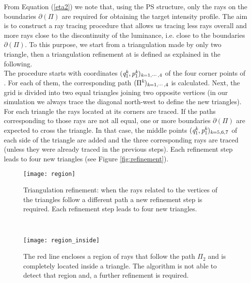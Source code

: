 From Equation (\ref{eta2}) we note that, using the PS structure, only the rays on the boundaries $\partial$$(\Pi)$ are required for obtaining the target intensity profile.
The aim is to construct a ray tracing procedure that allows us tracing less rays overall and more rays close to the discontinuity of the luminance, i.e. close to the boundaries $\partial$$(\Pi)$.
To this purpose, we start from a triangulation made by only two triangle, then a triangulation refinement at  is defined as explained in the following. \\ \indent
The procedure starts with coordinates $(\textit{q}_1^{\textit{k}},\textit{p}_1^{\textit{k}})_{\textit{k}=1, \cdots, 4}$ of the four corner points of . For each of them, the corresponding path $(\Pi^{\textit{k}})_{\textit{k}=1, \cdots, 4}$ is calculated. Next, the grid is divided into two equal triangles joining two opposite vertices (in our simulation we always trace the diagonal north-west to define the new triangles). For each triangle the rays located at its corners are traced. If the paths corresponding to
those rays are not all equal, one or more boundaries
$\partial$$(\Pi)$ are expected to cross the triangle.
In that case, the middle points $(\textit{q}_1^{\textit{k}},\textit{p}_1^{\textit{k}})_{\textit{k}=5,6,7}$ of each side of the triangle are added and
the three corresponding rays are traced (unless they were already traced in the previous steps). Each refinement step leads to four new triangles (see Figure \ref{fig:refinement}).
 \begin{figure}[h]
 \begin{minipage}[h]{\textwidth}
\centering
    \texttt{[image: region]}
  \caption{Triangulation refinement:
  when the rays related to the vertices of the triangles follow a different path a new refinement step is required.
   Each refinement step leads to four new triangles.}
  \label{fig:refinement}
\end{minipage}\\
\begin{minipage}[h]{\textwidth}
\centering
    \texttt{[image: region\_inside]}
  \caption{The red line encloses a region of rays that follow the path $\Pi_2$ and is completely located inside a triangle.
  The algorithm is not able to detect that region and, a further refinement is required.}
   \label{fig:region inside}
\end{minipage}
  \end{figure} \\ \indent
